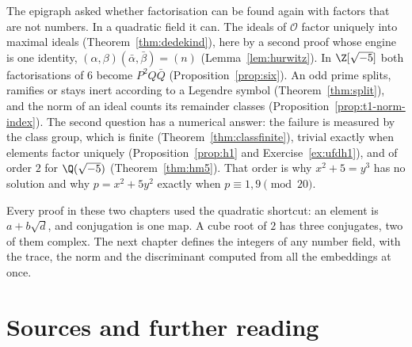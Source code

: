The epigraph asked whether factorisation can be found again with factors that are not numbers. In a quadratic field it can. The ideals of $\mathcal O$ factor uniquely into maximal ideals (Theorem~\ref{thm:dedekind}), here by a second proof whose engine is one identity, $(\alpha,\beta)(\bar\alpha,\bar\beta)=(n)$ (Lemma~\ref{lem:hurwitz}). In $\Z[\sqrt{-5}]$ both factorisations of $6$ become $P^2Q\bar Q$ (Proposition~\ref{prop:six}). An odd prime splits, ramifies or stays inert according to a Legendre symbol (Theorem~\ref{thm:split}), and the norm of an ideal counts its remainder classes (Proposition~\ref{prop:t1-norm-index}). The second question has a numerical answer: the failure is measured by the class group, which is finite (Theorem~\ref{thm:classfinite}), trivial exactly when elements factor uniquely (Proposition~\ref{prop:h1} and Exercise~\ref{ex:ufdh1}), and of order $2$ for $\Q(\sqrt{-5})$ (Theorem~\ref{thm:hm5}). That order is why $x^2+5=y^3$ has no solution and why $p=x^2+5y^2$ exactly when $p\equiv1,9\pmod{20}$.

Every proof in these two chapters used the quadratic shortcut: an element is $a+b\sqrt d$, and conjugation is one map. A cube root of $2$ has three conjugates, two of them complex. The next chapter defines the integers of any number field, with the trace, the norm and the discriminant computed from all the embeddings at once.

\section*{Sources and further reading}

